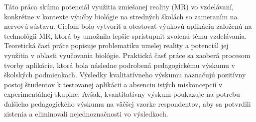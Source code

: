 Táto práca skúma potenciál využitia zmiešanej reality (MR) vo vzdelávaní, konkrétne v kontexte výučby biológie na stredných školách so zameraním na nervovú sústavu. 
Cieľom bolo vytvoriť a otestovať výukovú aplikáciu založenú na technológii MR, ktorá by umožnila lepšie sprístupniť zvolenú tému vzdelávania.
Teoretická časť práce popisuje problematiku umelej reality a potenciál jej využitia v oblasti vyučovania biológie.
Praktická časť práce sa zaoberá procesom tvorby aplikácie, ktorá bola následne podrobená pedagogickému výskumu v školských podmienkach.
Výsledky kvalitatívneho výskumu naznačujú pozitívny postoj študentov k testovanej aplikácii a absenciu istých miskoncepcií v experimentálnej skupine. 
Avšak, kvantitatívny výskum poukazuje na potrebu ďalšieho pedagogického výskumu na väčšej vzorke respondentov, aby sa potvrdili zistenia a eliminovali nejednoznačnosti vo výsledkoch.
